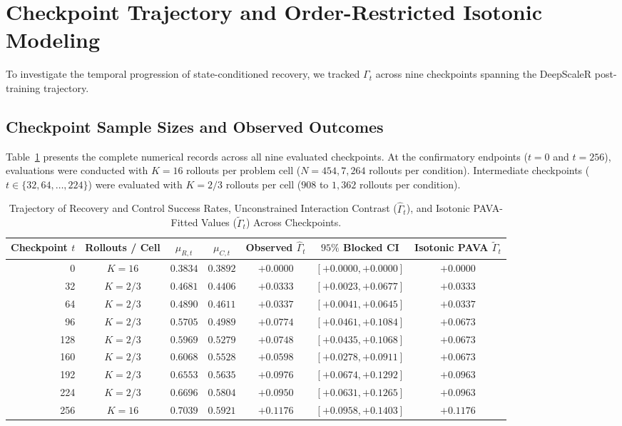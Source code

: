 \documentclass{article}
\begin{document}
\section{Checkpoint Trajectory and Order-Restricted Isotonic Modeling}
\label{app:trajectory}

To investigate the temporal progression of state-conditioned recovery, we tracked $\Gamma_t$ across nine checkpoints spanning the DeepScaleR post-training trajectory.

\subsection{Checkpoint Sample Sizes and Observed Outcomes}
Table~\ref{tab:app_trajectory} presents the complete numerical records across all nine evaluated checkpoints. At the confirmatory endpoints ($t=0$ and $t=256$), evaluations were conducted with $K=16$ rollouts per problem cell ($N=454, 7,264$ rollouts per condition). Intermediate checkpoints ($t \in \{32, 64, \dots, 224\}$) were evaluated with $K=2/3$ rollouts per cell ($908$ to $1,362$ rollouts per condition).

\begin{table}[h]
\centering
\caption{Trajectory of Recovery and Control Success Rates, Unconstrained Interaction Contrast ($\hat{\Gamma}_t$), and Isotonic PAVA-Fitted Values ($\tilde{\Gamma}_t$) Across Checkpoints.}
\label{tab:app_trajectory}
\small
\begin{tabular}{rcccccc}
\toprule
Checkpoint $t$ & Rollouts / Cell & $\mu_{R,t}$ & $\mu_{C,t}$ & Observed $\hat{\Gamma}_t$ & $95\%$ Blocked CI & Isotonic PAVA $\tilde{\Gamma}_t$ \\
\midrule
0   & $K=16$ & $0.3834$ & $0.3892$ & $+0.0000$ & $[+0.0000, +0.0000]$ & $+0.0000$ \\
32  & $K=2/3$ & $0.4681$ & $0.4406$ & $+0.0333$ & $[+0.0023, +0.0677]$ & $+0.0333$ \\
64  & $K=2/3$ & $0.4890$ & $0.4611$ & $+0.0337$ & $[+0.0041, +0.0645]$ & $+0.0337$ \\
96  & $K=2/3$ & $0.5705$ & $0.4989$ & $+0.0774$ & $[+0.0461, +0.1084]$ & $+0.0673$ \\
128 & $K=2/3$ & $0.5969$ & $0.5279$ & $+0.0748$ & $[+0.0435, +0.1068]$ & $+0.0673$ \\
160 & $K=2/3$ & $0.6068$ & $0.5528$ & $+0.0598$ & $[+0.0278, +0.0911]$ & $+0.0673$ \\
192 & $K=2/3$ & $0.6553$ & $0.5635$ & $+0.0976$ & $[+0.0674, +0.1292]$ & $+0.0963$ \\
224 & $K=2/3$ & $0.6696$ & $0.5804$ & $+0.0950$ & $[+0.0631, +0.1265]$ & $+0.0963$ \\
256 & $K=16$ & $0.7039$ & $0.5921$ & $+0.1176$ & $[+0.0958, +0.1403]$ & $+0.1176$ \\
\bottomrule
\end{tabular}
\end{table}
\end{document}
